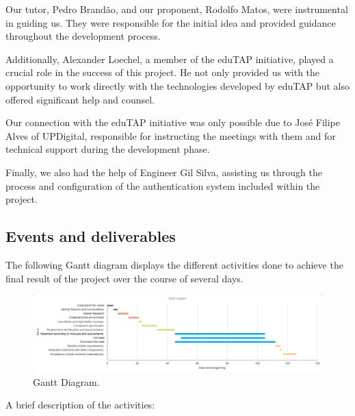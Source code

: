 \documentclass[12pt]{article}
\begin{document}
Our tutor, Pedro Brandão, and our proponent, Rodolfo Matos, were instrumental in guiding us. They were responsible for the initial idea
and provided guidance throughout the development process.

Additionally, Alexander Loechel, a member of the eduTAP initiative, played a crucial role in the success of this project. He not only
provided us with the opportunity to work directly with the technologies developed by eduTAP but also offered significant help and counsel.

Our connection with the eduTAP initiative was only possible due to José Filipe Alves of UPDigital, responsible for instructing
the meetings with them and for technical support during the development phase.

Finally, we also had the help of Engineer Gil Silva, assisting us through the process and configuration of the authentication system
included within the project.

\subsection{Events and deliverables}

The following Gantt\cite{gantt} diagram displays the different activities done to achieve the final result of the project over the course of several days.

\begin{figure}[H]
	\centering
	\includegraphics[width=\textwidth]{gantt.png}
	\caption{Gantt Diagram.}
\end{figure}

A brief description of the activities:
\end{document}
